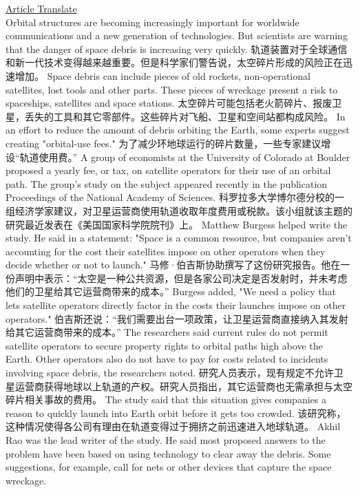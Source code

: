 \href{https://www.51voa.com/VOA_Special_English/researchers-call-for-a-use-tax-to-clean-up-space-84650_1.html}{Article Translate} \\
Orbital structures are becoming increasingly important for worldwide communications and a new generation of technologies. But scientists are warning that the danger of space debris is increasing very quickly.
轨道装置对于全球通信和新一代技术变得越来越重要。但是科学家们警告说，太空碎片形成的风险正在迅速增加。 
Space debris can include pieces of old rockets, non-operational satellites, lost tools and other parts. These pieces of wreckage present a risk to spaceships, satellites and space stations.
太空碎片可能包括老火箭碎片、报废卫星，丢失的工具和其它零部件。这些碎片对飞船、卫星和空间站都构成风险。
In an effort to reduce the amount of debris orbiting the Earth, some experts suggest creating "orbital-use fees."
为了减少环地球运行的碎片数量，一些专家建议增设“轨道使用费。”
A group of economists at the University of Colorado at Boulder proposed a yearly fee, or tax, on satellite operators for their use of an orbital path. The group's study on the subject appeared recently in the publication Proceedings of the National Academy of Sciences.
科罗拉多大学博尔德分校的一组经济学家建议，对卫星运营商使用轨道收取年度费用或税款。该小组就该主题的研究最近发表在《美国国家科学院院刊》上。
Matthew Burgess helped write the study. He said in a statement: "Space is a common resource, but companies aren't accounting for the cost their satellites impose on other operators when they decide whether or not to launch."
马修·伯吉斯协助撰写了这份研究报告。他在一份声明中表示：“太空是一种公共资源，但是各家公司决定是否发射时，并未考虑他们的卫星给其它运营商带来的成本。”
Burgess added, "We need a policy that lets satellite operators directly factor in the costs their launches impose on other operators."
伯吉斯还说：“我们需要出台一项政策，让卫星运营商直接纳入其发射给其它运营商带来的成本。”
The researchers said current rules do not permit satellite operators to secure property rights to orbital paths high above the Earth. Other operators also do not have to pay for costs related to incidents involving space debris, the researchers noted.
研究人员表示，现有规定不允许卫星运营商获得地球以上轨道的产权。研究人员指出，其它运营商也无需承担与太空碎片相关事故的费用。
The study said that this situation gives companies a reason to quickly launch into Earth orbit before it gets too crowded.
该研究称，这种情况使得各公司有理由在轨道变得过于拥挤之前迅速进入地球轨道。
Akhil Rao was the lead writer of the study. He said most proposed answers to the problem have been based on using technology to clear away the debris. Some suggestions, for example, call for nets or other devices that capture the space wreckage.
